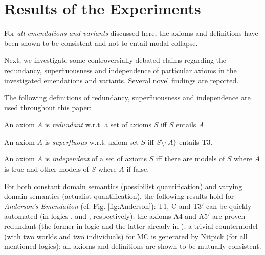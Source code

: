 \documentclass{birkjour}
\theoremstyle{definition}
\theoremstyle{remark}
\numberwithin{equation}{section}
\begin{document}
\section{Results of the Experiments}
For \emph{all emendations and variants} discussed here, the axioms and
definitions have been shown to be consistent and not to entail modal
collapse. 

Next, we investigate some controversially debated claims regarding the redundancy,
superfluousness and independence of particular axioms in the
investigated emendations and variants. Several novel findings are
reported.

The following definitions of redundancy, superfluousness and independence are used throughout this paper:

\begin{definition}
An axiom $A$ is \emph{redundant} w.r.t. a set of axioms $S$ iff $S$ entails $A$. 
\end{definition}

\begin{definition}
An axiom $A$ is \emph{superfluous} w.r.t. axiom set $S$ iff $S \setminus \{ A \}$ entails T3.
\end{definition}

\begin{definition}
  An axiom $A$ is \emph{independent} of a set of axioms $S$ iff
  there are models of $S$ where $A$ is true and other models of
  $S$ where $A$ if false.
\end{definition}


For both {constant domain semantics} (possibilist quantification) and {varying domain
semantics} (actualist quantification), the following results hold for \emph{Anderson's
Emendation} (cf. Fig. \ref{fig:Anderson}): T1, C
and T3$'$ can be quickly automated (in logics \K, \K and \KB,
respectively); the axioms A4 and A5$'$ are proven redundant (the former in logic \KFourB and the latter
already in \K); a trivial countermodel (with two worlds and  two
individuals) for MC is generated by Nitpick (for all mentioned
logics); all axioms and definitions are shown to be mutually
consistent.
\end{document}
